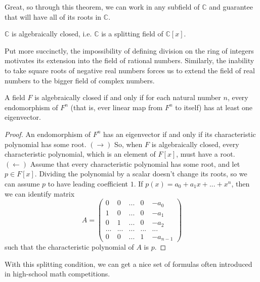   Great, so through this theorem, we can work in any subfield of $\mathbb{C}$ and guarantee that will have all of its roots in $\mathbb{C}$. 

  \begin{corollary}
    $\mathbb{C}$ is algebraically closed, i.e. $\mathbb{C}$ is a splitting field of $\mathbb{C}[x]$. 
  \end{corollary}

  Put more succinctly, the impossibility of defining division on the ring of integers motivates its extension into the field of rational numbers. Similarly, the inability to take square roots of negative real numbers forces us to extend the field of real numbers to the bigger field of complex numbers. 

  \begin{theorem}
    A field $F$ is algebraically closed if and only if for each natural number $n$, every endomorphism of $F^n$ (that is, ever linear map from $F^n$ to itself) has at least one eigenvector. 
  \end{theorem}
  \begin{proof}
    An endomorphism of $F^n$ has an eigenvector if and only if its characteristic polynomial has some root. $(\rightarrow)$ So, when $F$ is algebraically closed, every characteristic polynomial, which is an element of $F[x]$, must have a root. $(\leftarrow)$ Assume that every characteristic polynomial has some root, and let $p \in F[x]$. Dividing the polynomial by a scalar doesn't change its roots, so we can assume $p$ to have leading coefficient $1$. If $p(x) = a_0 + a_1 x + ... + x^n$, then we can identify matrix 
    \begin{equation}
      A = \begin{pmatrix}
      0 & 0 & ... & 0 & -a_0 \\
      1 & 0 & ... & 0 & -a_1 \\
      0 & 1 & ... & 0 & -a_2 \\
      ... & ... & ... & ... & ... \\
      0 & 0 & ... & 1 & -a_{n-1}
      \end{pmatrix}
    \end{equation}
    such that the characteristic polynomial of $A$ is $p$. 
  \end{proof}

  With this splitting condition, we can get a nice set of formulas often introduced in high-school math competitions. 

